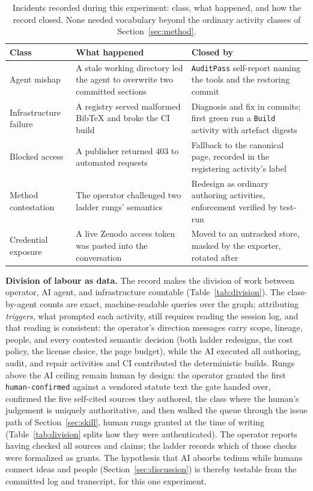 \begin{table}[t]
\caption{Incidents recorded during this experiment: class, what
happened, and how the record closed. None needed vocabulary beyond
the ordinary activity classes of Section~\ref{sec:method}.}
\label{tab:incidents}
\centering
\footnotesize
\begin{tabular}{p{1.9cm}p{3.6cm}p{1.9cm}}
\toprule
Class & What happened & Closed by \\
\midrule
Agent mishap & A stale working directory led the agent to overwrite two committed sections & \texttt{AuditPass} self-report naming the tools and the restoring commit \\
Infrastructure failure & A registry served malformed BibTeX and broke the CI build & Diagnosis and fix in commits; first green run a \texttt{Build} activity with artefact digests \\
Blocked access & A publisher returned 403 to automated requests & Fallback to the canonical page, recorded in the registering activity's label \\
Method contestation & The operator challenged two ladder rungs' semantics & Redesign as ordinary authoring activities, enforcement verified by test-run \\
Credential exposure & A live Zenodo access token was pasted into the conversation & Moved to an untracked store, masked by the exporter, rotated after \\
\bottomrule
\end{tabular}
\end{table}

\textbf{Division of labour as data.} The record makes the division of
work between operator, AI agent, and infrastructure countable
(Table~\ref{tab:division}). The class-by-agent counts are exact,
machine-readable queries over the graph; attributing \emph{triggers},
what prompted each activity, still requires reading the session log,
and that reading is consistent: the operator's direction messages
carry scope, lineage, people, and every contested semantic decision
(both ladder redesigns, the cost policy, the license choice, the
page budget), while the AI executed all authoring, audit, and repair
activities and CI contributed the deterministic builds. Rungs above the AI ceiling remain human by
design: the operator granted the first \texttt{human-confirmed}
against a vendored statute text the gate handed over, confirmed
the five self-cited sources they authored, the class where the
human's judgement is uniquely authoritative, and then walked the
queue through the issue path of Section~\ref{sec:skill},
\MHumanRungs{} human rungs granted at the time of writing
(Table~\ref{tab:division} splits how they were authenticated). The operator reports having checked
all sources and claims; the ladder records which of those checks were
formalized as grants. The hypothesis that AI absorbs tedium while
humans connect ideas and people (Section~\ref{sec:discussion}) is
thereby testable from the committed log and transcript, for this one
experiment.

